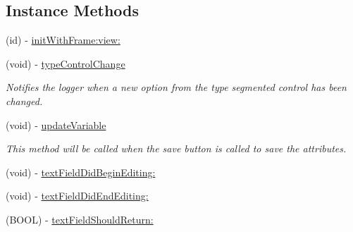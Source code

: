 \subsection*{Instance Methods}
\begin{DoxyCompactItemize}
\item 
(id) -\/ \hyperlink{interface_variable_edit_menu_view_ad1475d40e606d4f009f89321944e3678}{init\-With\-Frame\-:view\-:}
\item 
\hypertarget{interface_variable_edit_menu_view_aa9f8d1d0bae6f6dd7ef7269d1c2fbe30}{(void) -\/ \hyperlink{interface_variable_edit_menu_view_aa9f8d1d0bae6f6dd7ef7269d1c2fbe30}{type\-Control\-Change}}\label{interface_variable_edit_menu_view_aa9f8d1d0bae6f6dd7ef7269d1c2fbe30}

\begin{DoxyCompactList}\small\item\em Notifies the logger when a new option from the type segmented control has been changed. \end{DoxyCompactList}\item 
\hypertarget{interface_variable_edit_menu_view_a6bd6409bbc288f769683443ae909a4ad}{(void) -\/ \hyperlink{interface_variable_edit_menu_view_a6bd6409bbc288f769683443ae909a4ad}{update\-Variable}}\label{interface_variable_edit_menu_view_a6bd6409bbc288f769683443ae909a4ad}

\begin{DoxyCompactList}\small\item\em This method will be called when the save button is called to save the attributes. \end{DoxyCompactList}\item 
(void) -\/ \hyperlink{interface_variable_edit_menu_view_ac9394b979597f8df8e15f5abc1cc7a2e}{text\-Field\-Did\-Begin\-Editing\-:}
\item 
(void) -\/ \hyperlink{interface_variable_edit_menu_view_aa7337263d1e997c99cdc506fc61dcea3}{text\-Field\-Did\-End\-Editing\-:}
\item 
(B\-O\-O\-L) -\/ \hyperlink{interface_variable_edit_menu_view_a1a8ec9c257f3a894dc9b3389477f55e9}{text\-Field\-Should\-Return\-:}
\end{DoxyCompactItemize}
